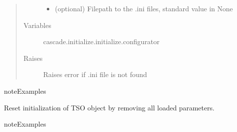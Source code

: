 \documentclass[a4paper,10pt,english]{sphinxmanual}
\begin{document}
\begin{fulllineitems}
\begin{fulllineitems}
\begin{quote}
\begin{description}
\begin{itemize}
\item {} 
 \textendash{} (optional) Filepath to the .ini files, standard value in None

\end{itemize}

\item[{Variables}] \leavevmode
{} \textendash{} cascade.initialize.initialize.configurator

\item[{Raises}] \leavevmode
{} \textendash{} Raises error if .ini file is not found

\end{description}\end{quote}

\begin{sphinxadmonition}{note}{Examples}

%
\begin{sphinxVerbatim}[commandchars=\\\{\}]
 
\end{sphinxVerbatim}
\end{sphinxadmonition}

\end{fulllineitems}


\begin{fulllineitems}
\label{\detokenize{cascade.TSO:cascade.TSO.TSO.TSOSuite.reset_TSO}}
Reset initialization of TSO object by removing all loaded parameters.

\begin{sphinxadmonition}{note}{Examples}

%
\begin{sphinxVerbatim}[commandchars=\\\{\}]
\end{sphinxVerbatim}
\end{sphinxadmonition}


\end{fulllineitems}
\end{fulllineitems}
\end{document}

